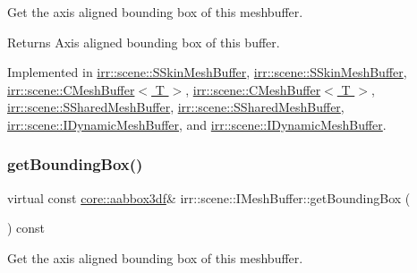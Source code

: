 Get the axis aligned bounding box of this meshbuffer. 

\begin{DoxyReturn}{Returns}
Axis aligned bounding box of this buffer. 
\end{DoxyReturn}


Implemented in \hyperlink{structirr_1_1scene_1_1SSkinMeshBuffer_a350535b406a7607bd392d07e5c3f9401}{irr\+::scene\+::\+S\+Skin\+Mesh\+Buffer}, \hyperlink{structirr_1_1scene_1_1SSkinMeshBuffer_a350535b406a7607bd392d07e5c3f9401}{irr\+::scene\+::\+S\+Skin\+Mesh\+Buffer}, \hyperlink{classirr_1_1scene_1_1CMeshBuffer_a759863b44c024f79747019f492a5c7cf}{irr\+::scene\+::\+C\+Mesh\+Buffer$<$ T $>$}, \hyperlink{classirr_1_1scene_1_1CMeshBuffer_a759863b44c024f79747019f492a5c7cf}{irr\+::scene\+::\+C\+Mesh\+Buffer$<$ T $>$}, \hyperlink{structirr_1_1scene_1_1SSharedMeshBuffer_a5a736dee60a5f5ebc929dc03c0763082}{irr\+::scene\+::\+S\+Shared\+Mesh\+Buffer}, \hyperlink{structirr_1_1scene_1_1SSharedMeshBuffer_a5a736dee60a5f5ebc929dc03c0763082}{irr\+::scene\+::\+S\+Shared\+Mesh\+Buffer}, \hyperlink{classirr_1_1scene_1_1IDynamicMeshBuffer_a9053baee5a13c8b51e306d99e5ef7427}{irr\+::scene\+::\+I\+Dynamic\+Mesh\+Buffer}, and \hyperlink{classirr_1_1scene_1_1IDynamicMeshBuffer_a9053baee5a13c8b51e306d99e5ef7427}{irr\+::scene\+::\+I\+Dynamic\+Mesh\+Buffer}.

\mbox{\label{classirr_1_1scene_1_1IMeshBuffer_ac53fe1096756a40f25dae25911e27c51}} 
\subsubsection{\texorpdfstring{get\+Bounding\+Box()}{getBoundingBox()}\hspace{0.1cm}{\footnotesize\ttfamily [2/2]}}
{\footnotesize\ttfamily virtual const \hyperlink{namespaceirr_1_1core_a60f4b4c744aba55f10530d503c6ecb04}{core\+::aabbox3df}\& irr\+::scene\+::\+I\+Mesh\+Buffer\+::get\+Bounding\+Box (\begin{DoxyParamCaption}{ }\end{DoxyParamCaption}) const\hspace{0.3cm}{\ttfamily [pure virtual]}}



Get the axis aligned bounding box of this meshbuffer. 

